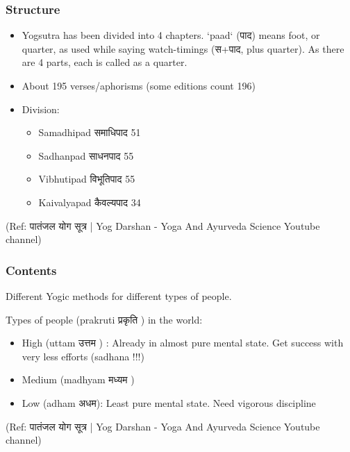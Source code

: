 \begin{frame}[fragile]\frametitle{Structure}

	\begin{itemize}
	\item Yogsutra has been divided into 4 chapters. `paad` (पाद) means foot, or quarter, as used while saying watch-timings (स+पाद, plus quarter). As there are 4 parts, each is called as a quarter.
	\item About 195 verses/aphorisms (some editions count 196)
	\item Division:
		\begin{itemize}
		\item Samadhipad समाधिपाद 51
		\item Sadhanpad साधनपाद 55
		\item Vibhutipad विभूतिपाद 55
		\item Kaivalyapad कैवल्यपाद 34
		\end{itemize}	
	\end{itemize}

\tiny{(Ref: पातंजल योग सूत्र | Yog Darshan - Yoga And Ayurveda Science Youtube channel)}

\end{frame}

\begin{frame}[fragile]\frametitle{Contents}

Different Yogic methods for different types of people.

Types of people (prakruti प्रकृति ) in the world:

	\begin{itemize}
	\item High (uttam उत्तम ) : Already in almost pure mental state. Get success with very less efforts (sadhana !!!) 
	\item Medium (madhyam मध्यम )
	\item Low (adham अधम): Least pure mental state. Need vigorous discipline
	\end{itemize}
	
\tiny{(Ref: पातंजल योग सूत्र | Yog Darshan - Yoga And Ayurveda Science Youtube channel)}

\end{frame}

